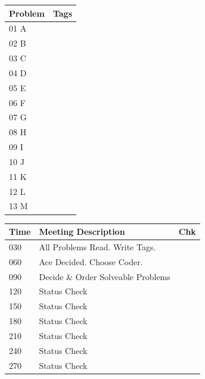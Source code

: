 \documentclass[twocolumn]{article}
\begin{document}
	\begin{tabular}{| l || m{6cm} | }
		\hline
		\textbf{Problem} & \textbf{Tags}\\	\hline
		01 A & \\	\hline
		02 B & \\	\hline
		03 C & \\	\hline
		04 D & \\	\hline
		05 E & \\	\hline
		06 F & \\	\hline
		07 G & \\	\hline
		08 H & \\	\hline
		09 I & \\	\hline
		10 J & \\	\hline
		11 K & \\	\hline
		12 L & \\	\hline
		13 M & \\	\hline
	\end{tabular}
	\newline\newline\newline
	\begin{tabular}{| l | l || m{7mm}| }
		\hline
		\textbf{Time} & \textbf{Meeting Description} & \textbf{Chk} \\	\hline
		030 & All Problems Read. Write Tags. & 	\\	\hline
		060 & Ace Decided. Choose Coder.	&	\\	\hline
		090 & Decide \& Order Solveable Problems &	\\	\hline
		120 & Status Check &	\\	\hline
		150 & Status Check &	\\	\hline
		180 & Status Check &	\\	\hline
		210 & Status Check &	\\	\hline
		240 & Status Check &	\\	\hline
		270 & Status Check &	\\	\hline
	\end{tabular}
\end{document}
